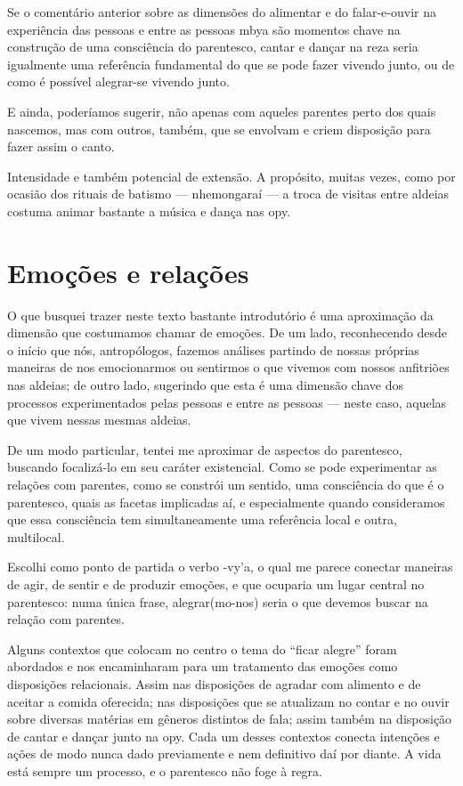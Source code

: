 Se o comentário anterior sobre as dimensões do alimentar e do
falar-e-ouvir na experiência das pessoas e entre as pessoas mbya são
momentos chave na construção de uma consciência do parentesco, cantar e
dançar na reza seria igualmente uma referência fundamental do que se
pode fazer vivendo junto, ou de como é possível alegrar-se vivendo
junto.

E ainda, poderíamos sugerir, não apenas com aqueles parentes perto dos
quais nascemos, mas com outros, também, que se envolvam e criem
disposição para fazer assim o canto.

Intensidade e também potencial de extensão. A propósito, muitas vezes,
como por ocasião dos rituais de batismo — nhemongaraí — a troca de
visitas entre aldeias costuma animar bastante a música e dança nas opy.

\section{Emoções e relações}

O que busquei trazer neste texto bastante introdutório é uma aproximação
da dimensão que costumamos chamar de emoções. De um lado, reconhecendo
desde o início que nós, antropólogos, fazemos análises partindo de
nossas próprias maneiras de nos emocionarmos ou sentirmos o que vivemos
com nossos anfitriões nas aldeias; de outro lado, sugerindo que esta é
uma dimensão chave dos processos experimentados pelas pessoas e entre
as pessoas — neste caso, aquelas que vivem nessas mesmas aldeias.

De um modo particular, tentei me aproximar de aspectos do parentesco,
buscando focalizá-lo em seu caráter existencial. Como se pode
experimentar as relações com parentes, como se constrói um sentido, uma
consciência do que é o parentesco, quais as facetas implicadas aí, e
especialmente quando consideramos que essa consciência tem
simultaneamente uma referência local e outra, multilocal.

Escolhi como ponto de partida o verbo -vy’a, o qual me parece conectar
maneiras de agir, de sentir e de produzir emoções, e que ocuparia um
lugar central no parentesco: numa única frase, alegrar(mo-nos) seria o
que devemos buscar na relação com parentes. 

Alguns contextos que colocam no centro o tema do ``ficar alegre'' foram
abordados e nos encaminharam para um tratamento das emoções como
disposições relacionais. Assim nas disposições de agradar com alimento
e de aceitar a comida oferecida; nas disposições que se atualizam no
contar e no ouvir sobre diversas matérias em gêneros distintos de fala;
assim também na disposição de cantar e dançar junto na opy. Cada um
desses contextos conecta intenções e ações de modo nunca dado
previamente e nem definitivo daí por diante. A vida está sempre um
processo, e o parentesco não foge à regra.

